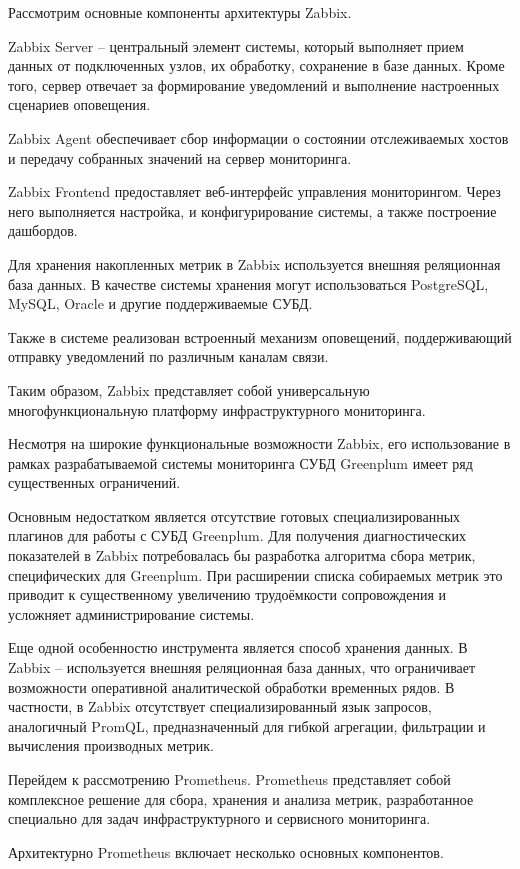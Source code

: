 Рассмотрим основные компоненты архитектуры Zabbix.

Zabbix Server -- центральный элемент системы, который выполняет прием данных от подключенных узлов, их обработку, сохранение в базе данных. Кроме того, сервер отвечает за формирование уведомлений и выполнение настроенных сценариев оповещения.

Zabbix Agent обеспечивает сбор информации о состоянии отслеживаемых хостов и передачу собранных значений на сервер мониторинга.

Zabbix Frontend предоставляет веб-интерфейс управления мониторингом. Через него выполняется настройка, и конфигурирование системы, а также построение дашбордов.

Для хранения накопленных метрик в Zabbix используется внешняя реляционная база данных. В качестве системы хранения могут использоваться PostgreSQL, MySQL, Oracle и другие поддерживаемые СУБД.

Также в системе реализован встроенный механизм оповещений, поддерживающий отправку уведомлений по различным каналам связи.

Таким образом, Zabbix представляет собой универсальную многофункциональную платформу инфраструктурного мониторинга.

Несмотря на широкие функциональные возможности Zabbix, его использование в рамках разрабатываемой системы мониторинга СУБД Greenplum имеет ряд существенных ограничений.

Основным недостатком является отсутствие готовых специализированных плагинов для работы с СУБД Greenplum. Для получения диагностических показателей в Zabbix потребовалась бы разработка алгоритма сбора метрик, специфических для Greenplum. При расширении списка собираемых метрик это приводит к существенному увеличению трудоёмкости сопровождения и усложняет администрирование системы.

Еще одной особенностю инструмента является способ хранения данных. В Zabbix -- используется внешняя реляционная база данных, что ограничивает возможности оперативной аналитической обработки временных рядов. В частности, в Zabbix отсутствует специализированный язык запросов, аналогичный PromQL, предназначенный для гибкой агрегации, фильтрации и вычисления производных метрик.

Перейдем к рассмотрению Prometheus. Prometheus представляет собой комплексное решение для сбора, хранения и анализа метрик, разработанное специально для задач инфраструктурного и сервисного мониторинга.

Архитектурно Prometheus включает несколько основных компонентов.

